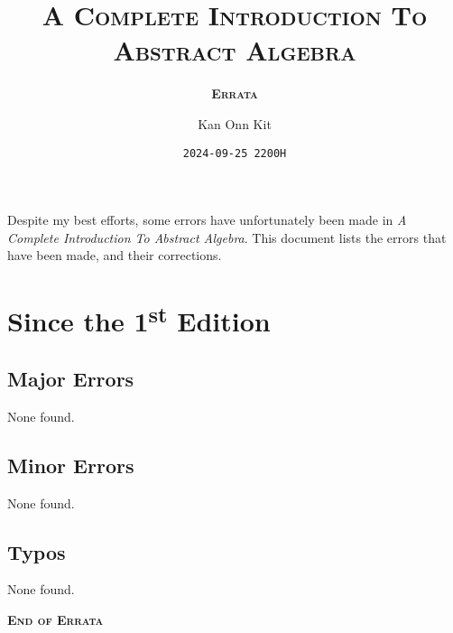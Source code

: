 \documentclass[
    a4paper,
    chapterprefix,
    DIV=9
]{scrartcl}
\title{\bfseries\scshape A Complete Introduction To\\Abstract Algebra}
\subtitle{\bfseries\scshape Errata}
\date{\texttt{2024-09-25 2200H}}
\author{Kan Onn Kit}
\begin{document}
\maketitle

Despite my best efforts, some errors have unfortunately been made in \textit{A Complete Introduction To Abstract Algebra}. This document lists the errors that have been made, and their corrections.

\section*{Since the 1\textsuperscript{st} Edition}
\subsection*{Major Errors}
None found.

\subsection*{Minor Errors}
None found.

\subsection*{Typos}
None found.

\begin{center}
    \vfill
    {\Large\bfseries\scshape End of Errata}
\end{center}
\end{document}
